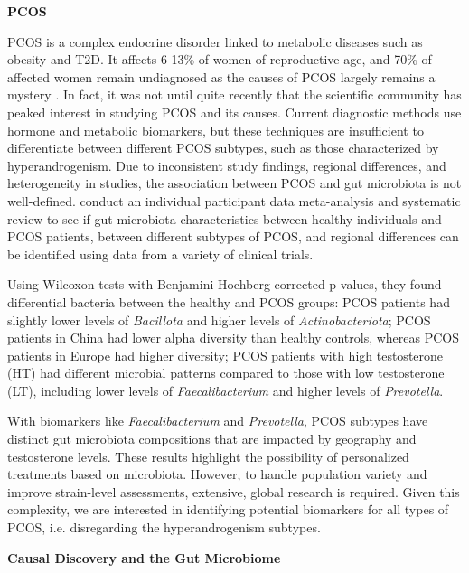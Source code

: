 \documentclass[12pt,letterpaper]{article}
\begin{document}
\textbf{PCOS}

PCOS is a complex endocrine disorder linked to metabolic diseases such as obesity and T2D. It affects 6-13\% of women of reproductive age, and 70\% of affected women remain undiagnosed as the causes of PCOS largely remains a mystery \citep{who2025pcos}. In fact, it was not until quite recently that the scientific community has peaked interest in studying PCOS and its causes. Current diagnostic methods use hormone and metabolic biomarkers, but these techniques are insufficient to differentiate between different PCOS subtypes, such as those characterized by hyperandrogenism. Due to inconsistent study findings, regional differences, and heterogeneity in studies, the association between PCOS and gut microbiota is not well-defined. \citep{yang2024pcos} conduct an individual participant data meta-analysis and systematic review to see if gut microbiota characteristics between healthy individuals and PCOS patients, between different subtypes of PCOS, and regional differences can be identified using data from a variety of clinical trials.

Using Wilcoxon tests with Benjamini-Hochberg corrected p-values, they found differential bacteria between the healthy and PCOS groups: PCOS patients had slightly lower levels of \textit{Bacillota} and higher levels of \textit{Actinobacteriota}; PCOS patients in China had lower alpha diversity than healthy controls, whereas PCOS patients in Europe had higher diversity; PCOS patients with high testosterone (HT) had different microbial patterns compared to those with low testosterone (LT), including lower levels of \textit{Faecalibacterium} and higher levels of \textit{Prevotella}. 

With biomarkers like \textit{Faecalibacterium} and \textit{Prevotella}, PCOS subtypes have distinct gut microbiota compositions that are impacted by geography and testosterone levels. These results highlight the possibility of personalized treatments based on microbiota. However, to handle population variety and improve strain-level assessments, extensive, global research is required. Given this complexity, we are interested in identifying potential biomarkers for all types of PCOS, i.e. disregarding the hyperandrogenism subtypes. \newline

\textbf{Causal Discovery and the Gut Microbiome}
\end{document}
